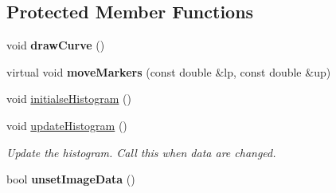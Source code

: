 \subsection*{Protected Member Functions}
\begin{DoxyCompactItemize}
\item 
\mbox{\label{classBarScreenHistogram_af87a78ee267e6361ae73cf61845b31d6}} 
void {\bfseries draw\+Curve} ()
\item 
\mbox{\label{classBarScreenHistogram_a49b7afd95b207b1fa146d6e14dfde4a5}} 
virtual void {\bfseries move\+Markers} (const double \&lp, const double \&up)
\item 
void \mbox{\hyperlink{classBarScreen_ae652343345f7cc3f7726569c1195ee9a}{initialse\+Histogram}} ()
\item 
\mbox{\label{classBarScreen_a3e9d73bcf97e00634bf7c8b78d2cbad0}} 
void \mbox{\hyperlink{classBarScreen_a3e9d73bcf97e00634bf7c8b78d2cbad0}{update\+Histogram}} ()
\begin{DoxyCompactList}\small\item\em Update the histogram. Call this when data are changed. \end{DoxyCompactList}\item 
\mbox{\label{classBarScreen_a4d2a43c01c702ce90ffd4433a07d2b73}} 
bool {\bfseries unset\+Image\+Data} ()
\end{DoxyCompactItemize}
